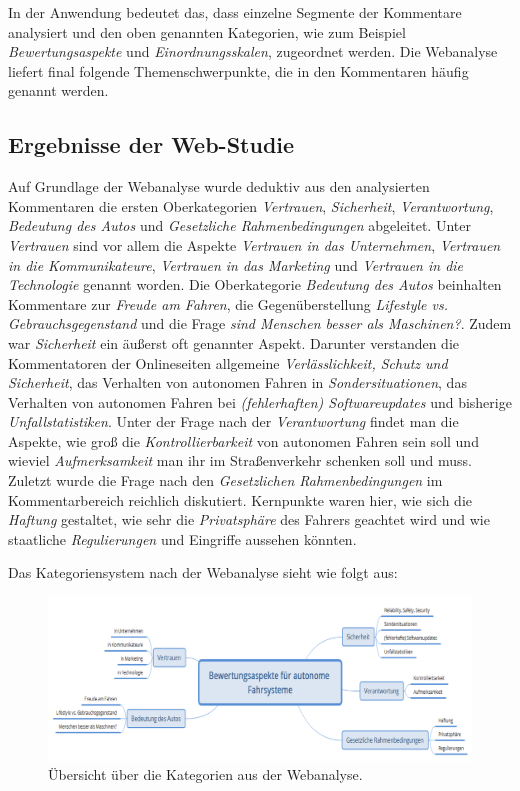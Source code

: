 \documentclass[12pt]{article}
\begin{document}
In der Anwendung bedeutet das, dass einzelne Segmente der Kommentare analysiert und den oben genannten Kategorien, wie zum Beispiel \emph{Bewertungsaspekte} und \emph{Einordnungsskalen}, zugeordnet werden. Die Webanalyse liefert final folgende Themenschwerpunkte, die in den Kommentaren häufig genannt werden.

\subsection*{Ergebnisse der Web-Studie}

Auf Grundlage der Webanalyse wurde deduktiv aus den analysierten Kommentaren die ersten Oberkategorien \emph{Vertrauen}, \emph{Sicherheit}, \emph{Verantwortung}, \emph{Bedeutung des Autos} und \emph{Gesetzliche Rahmenbedingungen} abgeleitet.
Unter \emph{Vertrauen} sind vor allem die Aspekte \emph{Vertrauen in das Unternehmen}, \emph{Vertrauen in die Kommunikateure}, \emph{Vertrauen in das Marketing} und \emph{Vertrauen in die Technologie} genannt worden.
Die Oberkategorie \emph{Bedeutung des Autos} beinhalten Kommentare zur \emph{Freude am Fahren}, die Gegenüberstellung \emph{Lifestyle vs. Gebrauchsgegenstand} und die Frage \emph{sind Menschen besser als Maschinen?}.
Zudem war \emph{Sicherheit} ein äußerst oft genannter Aspekt. Darunter verstanden die Kommentatoren der Onlineseiten allgemeine \emph{Verlässlichkeit, Schutz und Sicherheit}, das Verhalten von autonomen Fahren in \emph{Sondersituationen}, das Verhalten von autonomen Fahren bei \emph{(fehlerhaften) Softwareupdates} und bisherige \emph{Unfallstatistiken}.
Unter der Frage nach der \emph{Verantwortung} findet man die Aspekte, wie groß die \emph{Kontrollierbarkeit} von autonomen Fahren sein soll und wieviel \emph{Aufmerksamkeit} man ihr im Straßenverkehr schenken soll und muss.
Zuletzt wurde die Frage nach den \emph{Gesetzlichen Rahmenbedingungen} im Kommentarbereich reichlich diskutiert. Kernpunkte waren hier, wie sich die \emph{Haftung} gestaltet, wie sehr die \emph{Privatsphäre} des Fahrers geachtet wird und wie staatliche \emph{Regulierungen} und Eingriffe aussehen könnten.

Das Kategoriensystem nach der Webanalyse sieht wie folgt aus:

\begin{figure}[htp]
  \centering
  \includegraphics[width=13cm]{Webanlayse.png}
  \caption{Übersicht über die Kategorien aus der Webanalyse.}
  \label{fig:ErgebnisseWeb}
\end{figure}
\end{document}
